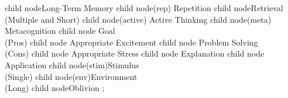 child{
                node{Long-Term Memory}
                child{
                                node(rep){ Repetition }
                                child{
                                                node{Retrieval\\(Multiple and Short)}
                                                child{
                                                                node(active){ Active Thinking }
                                                                child{
                                                                                node(meta){ Metacognition }
                                                                                child{
                                                                                                node{ Goal\\(Pros) }
                                                                                                child{
                                                                                                                node{ Appropriate Excitement }
                                                                                                        }
                                                                                        }
                                                                                child{
                                                                                                node{ Problem Solving\\(Cons) }
                                                                                                child{
                                                                                                                node{ Appropriate Stress }
                                                                                                        }
                                                                                        }
                                                                        }
                                                                child{
                                                                                node{ Explanation }
                                                                        }
                                                                child{
                                                                                node{ Application }
                                                                        }
                                                        }
                                        }
                                child{
                                                node(stim){Stimulus\\(Single)}
                                                child{
                                                                node(env){Environment\\(Long)}
                                                        }
                                        }
                        }
                child{
                                node{Oblivion}
                        }
        }
;